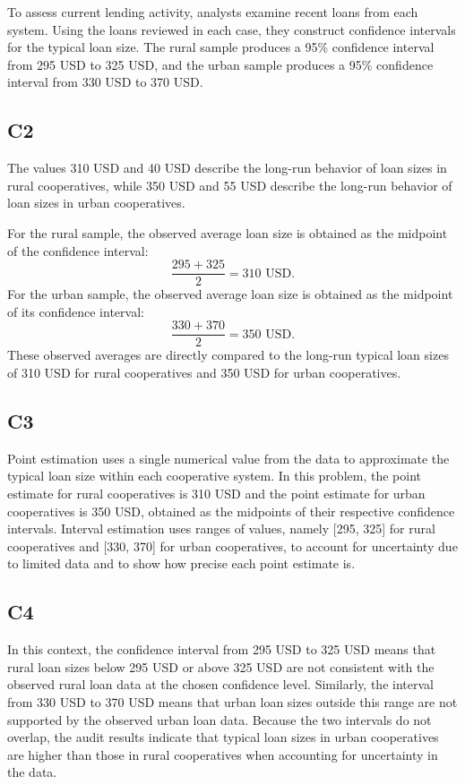 \begin{ExamProblems}
		To assess current lending activity, analysts examine recent loans from each system. Using the loans reviewed in each case, they construct confidence intervals for the typical loan size. The rural sample produces a 95\% confidence interval from 295 USD to 325 USD, and the urban sample produces a 95\% confidence interval from 330 USD to 370 USD.
		
		\subsection*{C2}
		The values 310 USD and 40 USD describe the long-run behavior of loan sizes in rural cooperatives, while 350 USD and 55 USD describe the long-run behavior of loan sizes in urban cooperatives.
		
		For the rural sample, the observed average loan size is obtained as the midpoint of the confidence interval:
		\[
		\frac{295 + 325}{2} = 310 \text{ USD}.
		\]
		For the urban sample, the observed average loan size is obtained as the midpoint of its confidence interval:
		\[
		\frac{330 + 370}{2} = 350 \text{ USD}.
		\]
		These observed averages are directly compared to the long-run typical loan sizes of 310 USD for rural cooperatives and 350 USD for urban cooperatives.
		
		\subsection*{C3}
		Point estimation uses a single numerical value from the data to approximate the typical loan size within each cooperative system. In this problem, the point estimate for rural cooperatives is 310 USD and the point estimate for urban cooperatives is 350 USD, obtained as the midpoints of their respective confidence intervals. Interval estimation uses ranges of values, namely [295, 325] for rural cooperatives and [330, 370] for urban cooperatives, to account for uncertainty due to limited data and to show how precise each point estimate is.
		
		\subsection*{C4}
		In this context, the confidence interval from 295 USD to 325 USD means that rural loan sizes below 295 USD or above 325 USD are not consistent with the observed rural loan data at the chosen confidence level. Similarly, the interval from 330 USD to 370 USD means that urban loan sizes outside this range are not supported by the observed urban loan data. Because the two intervals do not overlap, the audit results indicate that typical loan sizes in urban cooperatives are higher than those in rural cooperatives when accounting for uncertainty in the data.
		

\end{ExamProblems}
